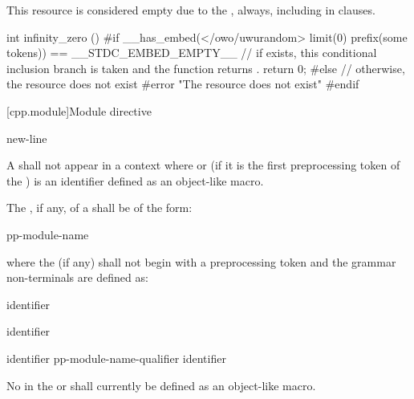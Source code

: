 \begin{example}
This resource is considered empty due to the  ,
always, including in  clauses.

\begin{codeblock}
int infinity_zero () {
#if __has_embed(</owo/uwurandom> limit(0) prefix(some tokens)) == __STDC_EMBED_EMPTY__
  // if  exists, this conditional inclusion branch is taken and the function returns .
  return 0;
#else
  // otherwise, the resource does not exist
#error "The resource does not exist"
#endif
}
\end{codeblock}
\end{example}

[cpp.module]{Module directive}
%

\begin{bnf}
\br
       \terminal{;} new-line
\end{bnf}

\pnum
A  shall not
appear in a context where 
or (if it is the first preprocessing token of the ) 
is an identifier defined as an object-like macro.

\pnum
The , if any, of a 
shall be of the form:
\begin{ncsimplebnf}
pp-module-name  
\end{ncsimplebnf}
where the  (if any) shall not begin with
a \tcode{(} preprocessing token and
the grammar non-terminals are defined as:
\begin{ncbnf}
\br
     identifier
\end{ncbnf}
\begin{ncbnf}
\br
    \terminal{:}  identifier
\end{ncbnf}
\begin{ncbnf}
\br
    identifier \br
    pp-module-name-qualifier identifier 
\end{ncbnf}
No  in
the  or 
shall currently be defined as an object-like macro.

